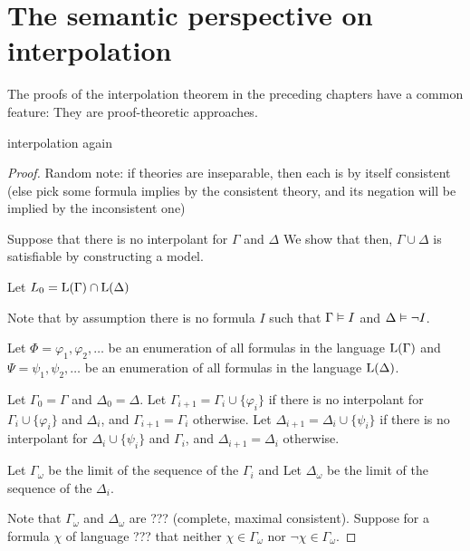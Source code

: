
\chapter{The semantic perspective on interpolation}

\cite{robinson1956result}

The proofs of the interpolation theorem in the preceding chapters have a common feature:
They are proof-theoretic approaches.


\begin{thm}
	interpolation again
\end{thm}
\begin{proof}
	Random note: if theories are inseparable, then each is by itself consistent (else pick some formula implies by the consistent theory, and its negation will be implied by the inconsistent one)


	Suppose that there is no interpolant for $\Gamma$ and $\Delta$
	We show that then, $\Gamma\cup\Delta$ is satisfiable by constructing a model.

	Let $L_0 = \operatorname{L}(\Gamma) \cap \operatorname{L}(\Delta)$

	Note that by assumption there is no formula $I$ such that $\Gamma\vDash I$ and $\Delta \vDash \lnot I$.



	Let $\Phi = \varphi_1, \varphi_2, \dots$ be an enumeration of all formulas in the language $\operatorname{L}(\Gamma)$
	and
	$\Psi = \psi_1, \psi_2, \dots$ be an enumeration of all formulas in the language $\operatorname{L}(\Delta)$.

	Let $\Gamma_0 = \Gamma$
	and $\Delta_0 = \Delta$.
	Let $\Gamma_{i+1} = \Gamma_i \cup \{\varphi_i\}$ if there is no interpolant for $\Gamma_i \cup \{\varphi_i\}$ and $\Delta_i$, and $\Gamma_{i+1} = \Gamma_i$ otherwise.
	Let $\Delta_{i+1} = \Delta_i \cup \{\psi_i\}$ if there is no interpolant for $\Delta_i \cup \{\psi_i\}$ and $\Gamma_i$, and $\Delta_{i+1} = \Delta_i$ otherwise.

	Let $\Gamma_\omega$ be the limit of the sequence of the $\Gamma_i$ and
	Let $\Delta_\omega$ be the limit of the sequence of the $\Delta_i$.

	Note that $\Gamma_\omega$ and $\Delta_\omega$ are ??? (complete, maximal consistent).
	Suppose for a formula $\chi$ of language ??? that neither
	$\chi \in \Gamma_\omega$
	nor
	$\lnot\chi \in \Gamma_\omega$.


\end{proof}
